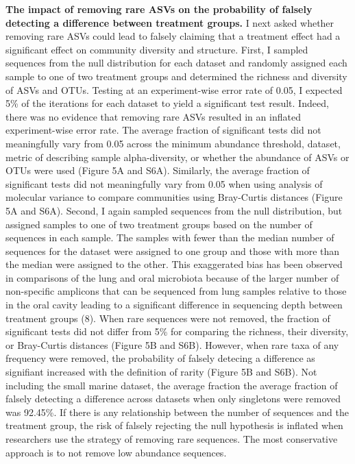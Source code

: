 \documentclass[
]{article}
\begin{document}
\textbf{The impact of removing rare ASVs on the probability of falsely
detecting a difference between treatment groups.} I next asked whether
removing rare ASVs could lead to falsely claiming that a treatment
effect had a significant effect on community diversity and structure.
First, I sampled sequences from the null distribution for each dataset
and randomly assigned each sample to one of two treatment groups and
determined the richness and diversity of ASVs and OTUs. Testing at an
experiment-wise error rate of 0.05, I expected 5\% of the iterations for
each dataset to yield a significant test result. Indeed, there was no
evidence that removing rare ASVs resulted in an inflated experiment-wise
error rate. The average fraction of significant tests did not
meaningfully vary from 0.05 across the minimum abundance threshold,
dataset, metric of describing sample alpha-diversity, or whether the
abundance of ASVs or OTUs were used (Figure 5A and S6A). Similarly, the
average fraction of significant tests did not meaningfully vary from
0.05 when using analysis of molecular variance to compare communities
using Bray-Curtis distances (Figure 5A and S6A). Second, I again sampled
sequences from the null distribution, but assigned samples to one of two
treatment groups based on the number of sequences in each sample. The
samples with fewer than the median number of sequences for the dataset
were assigned to one group and those with more than the median were
assigned to the other. This exaggerated bias has been observed in
comparisons of the lung and oral microbiota because of the larger number
of non-specific amplicons that can be sequenced from lung samples
relative to those in the oral cavity leading to a significant difference
in sequencing depth between treatment groups (8). When rare sequences
were not removed, the fraction of significant tests did not differ from
5\% for comparing the richness, their diversity, or Bray-Curtis
distances (Figure 5B and S6B). However, when rare taxa of any frequency
were removed, the probability of falsely detecing a difference as
signifiant increased with the definition of rarity (Figure 5B and S6B).
Not including the small marine dataset, the average fraction the average
fraction of falsely detecting a difference across datasets when only
singletons were removed was 92.45\%. If there is any relationship
between the number of sequences and the treatment group, the risk of
falsely rejecting the null hypothesis is inflated when researchers use
the strategy of removing rare sequences. The most conservative approach
is to not remove low abundance sequences.
\end{document}
